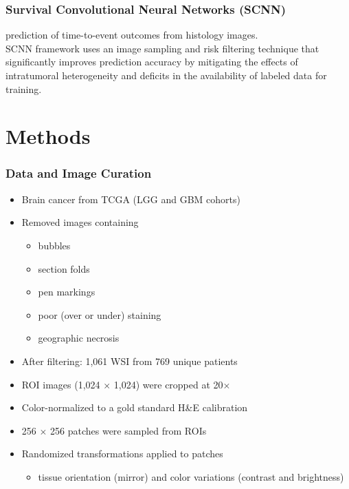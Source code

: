 \message{ !name(presentation.tex)}\documentclass[usenames,dvipsnames]{beamer}
\begin{document}
\begin{frame}
  \frametitle{Survival Convolutional Neural Networks (SCNN)}
  prediction of time-to-event outcomes from histology images. \\
  SCNN framework uses an image sampling and risk filtering technique that
  significantly improves prediction accuracy by mitigating the effects of
  intratumoral heterogeneity and deficits in the availability of labeled data
  for training.
\end{frame}

\section{Methods}\label{sec:methods}
\begin{frame}
  \frametitle{Data and Image Curation}
  \begin{itemize}
    \item Brain cancer from TCGA (LGG and GBM cohorts)
    \item Removed images containing
    \begin{itemize}
      \item bubbles
      \item section folds
      \item pen markings
      \item poor (over or under) staining
      \item geographic necrosis
    \end{itemize}
    \item After filtering: 1,061 WSI from 769 unique patients
    \item ROI images (1,024 $\times$ 1,024) were cropped at 20$\times$
    \item Color-normalized to a gold standard H\&E calibration
    \item 256 $\times$ 256 patches were sampled from ROIs
    \item Randomized transformations applied to patches
    \begin{itemize}
      \item tissue orientation (mirror) and color variations (contrast and brightness)
    \end{itemize}
  \end{itemize}
\end{frame}
\end{document}
